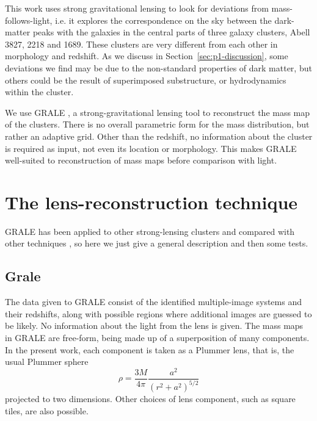 \documentclass[
  11pt,
  twoside,
  openright,
  titlepage,
  headings=optiontoheadandtoc
]{scrbook}
\begin{document}
This work uses strong gravitational lensing to look for deviations from 
mass-follows-light, i.e. it explores the correspondence on the sky between the
dark-matter peaks with the galaxies in the central parts of three
galaxy clusters, Abell 3827, 2218 and 1689. These clusters are very
different from each other in morphology and redshift. 
As we discuss in Section~\ref{sec:p1-discussion}, some deviations we find may be due to the 
non-standard properties of dark matter, but others could be the result of 
superimposed substructure, or hydrodynamics within the cluster. 

We use GRALE \citep{2006MNRAS.367.1209L,2007MNRAS.380.1729L}, a
strong-gravitational lensing tool to reconstruct the mass map of the
clusters.  There is no overall parametric form for the mass
distribution, but rather an adaptive grid.  Other than the redshift,
no information about the cluster is required as input, not even its
location or morphology.  This makes GRALE well-suited to reconstruction of
mass maps before comparison with light.





\section{The lens-reconstruction technique}

GRALE has been applied to other strong-lensing clusters
\citep{2008MNRAS.389..415L,2009MNRAS.397..341L}
and compared with other techniques
\citep{2010MNRAS.408.1916Z,2011MNRAS.413.1753Z}, so here we just give
a general description and then some tests.

\subsection{Grale}

The data given to GRALE consist of the identified multiple-image
systems and their redshifts, along with possible regions where
additional images are guessed to be likely.  No information about the
light from the lens is given.  The mass maps in GRALE are free-form,
being made up of a superposition of many components.  In the present
work, each component is taken as a Plummer lens, that is, the usual
Plummer sphere
\begin{equation}
\rho = \frac{3M}{4\pi} \frac{a^2}{(r^2+a^2)^{5/2}}
\end{equation}
projected to two dimensions.  Other choices of lens component, such
as square tiles, are also possible.
\end{document}
